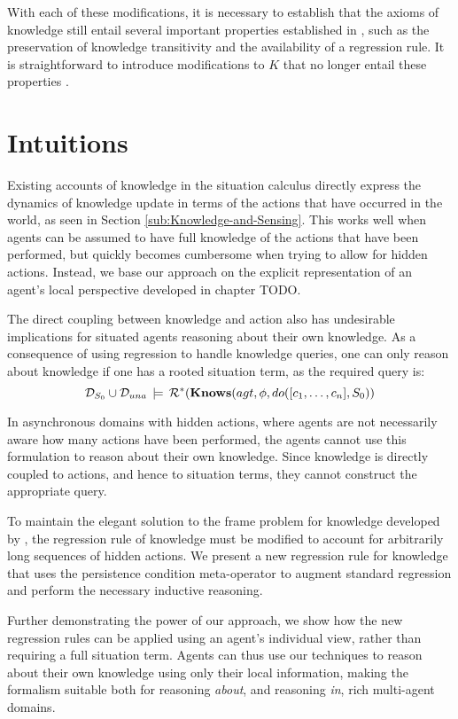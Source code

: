 With each of these modifications, it is necessary to establish that
the axioms of knowledge still entail several important properties
established in \citep{scherl03sc_knowledge}, such as the preservation
of knowledge transitivity and the availability of a regression rule.
It is straightforward to introduce modifications to $K$ that no longer
entail these properties \citep{Petrick06thesis,Lesperance99sitcalc_approach}.


\section{Intuitions}

Existing accounts of knowledge in the situation calculus directly
express the dynamics of knowledge update in terms of the actions that
have occurred in the world, as seen in Section \ref{sub:Knowledge-and-Sensing}.
This works well when agents can be assumed to have full knowledge
of the actions that have been performed, but quickly becomes cumbersome
when trying to allow for hidden actions. Instead, we base our approach
on the explicit representation of an agent's local perspective developed
in chapter TODO.

The direct coupling between knowledge and action also has undesirable
implications for situated agents reasoning about their own knowledge.
As a consequence of using regression to handle knowledge queries,
one can only reason about knowledge if one has a rooted situation
term, as the required query is:\[
\mathcal{D}_{S_{0}}\cup\mathcal{D}_{una}\,\models\,\mathcal{R}^{*}(\mathbf{Knows}(agt,\phi,do([c_{1},\dots,c_{n}],S_{0}))\]


In asynchronous domains with hidden actions, where agents are not
necessarily aware how many actions have been performed, the agents
cannot use this formulation to reason about their own knowledge. Since
knowledge is directly coupled to actions, and hence to situation terms,
they cannot construct the appropriate query.

To maintain the elegant solution to the frame problem for knowledge
developed by \citet{scherl03sc_knowledge}, the regression rule of
knowledge must be modified to account for arbitrarily long sequences
of hidden actions. We present a new regression rule for knowledge
that uses the persistence condition meta-operator to augment standard
regression and perform the necessary inductive reasoning.

Further demonstrating the power of our approach, we show how the new
regression rules can be applied using an agent's individual view,
rather than requiring a full situation term. Agents can thus use our
techniques to reason about their own knowledge using only their local
information, making the formalism suitable both for reasoning \emph{about},
and reasoning \emph{in}, rich multi-agent domains.


